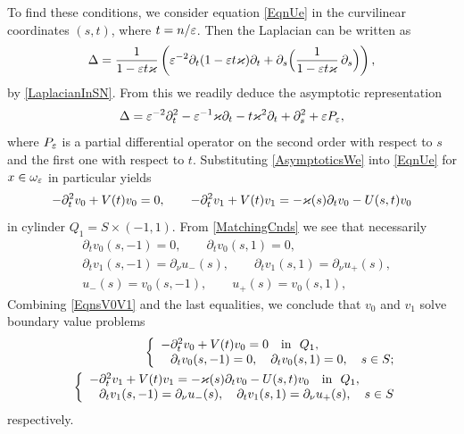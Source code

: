 To find these conditions, we consider equation \eqref{EqnUe} in the curvilinear coordinates $(s,t)$, where $t=n/\varepsilon$.
Then the Laplacian can be written as
\begin{equation}
  \Delta =\frac1{1-\varepsilon t\varkappa}\left( \varepsilon^{-2}\partial_t
(1-\varepsilon t\varkappa)\partial_t +\partial_s
\Big(\frac1{1-\varepsilon t\varkappa}\,\partial_s\Big)\right),
\end{equation}
by \eqref{LaplacianInSN}.
From this we readily deduce the asymptotic representation
$$
\Delta= \varepsilon^{-2}\partial^2_t-\varepsilon^{-1}\varkappa\partial_t-t \varkappa^2\partial_t+\partial^2_s+\varepsilon P_\varepsilon,
$$
where $P_\varepsilon$ is a partial differential operator on the second order with respect to $s$ and the first one with respect to $t$.
Substituting \eqref{AsymptoticsWe} into \eqref{EqnUe} for $x\in \omega_\varepsilon$ in particular yields
\begin{equation}\label{EqnsV0V1}
-\partial_t^2 v_0+V(t)v_0=0, \qquad -\partial_t^2 v_1+V(t)v_1=-\varkappa(s)\partial_t v_0-U(s,t)v_0
\end{equation}
in cylinder $Q_1=S\times(-1,1)$.
From \eqref{MatchingCnds} we see that necessarily
\begin{eqnarray} \nonumber
  &\partial_t v_0(s,- 1)=0, \qquad \partial_t v_0(s, 1)=0, \\\nonumber
&\partial_t v_1(s, -1)=\partial_\nu u_-(s), \qquad
\partial_t v_1(s, 1)=\partial_\nu u_+(s),\\
\label{FittingCnds}
  &u_-(s)=v_0(s,-1),\qquad u_+(s)=v_0(s,1),
\end{eqnarray}
Combining \eqref{EqnsV0V1} and the last equalities, we conclude that $v_0$ and $v_1$ solve boundary value problems
\begin{eqnarray}\label{problemV0}
&&\left\{
  \begin{array}{ll}
    -\partial_t^2 v_0+V(t)v_0=0 \quad \hbox{in \ } Q_1, \\
    \phantom{-}\partial_t v_0(s,- 1)=0, \quad \partial_t v_0(s, 1)=0, \quad s\in S;
  \end{array}
\right.\\\label{problemV1}
&&\left\{
  \begin{array}{ll}
    -\partial_t^2 v_1+V(t)v_1=-\varkappa(s)\partial_t v_0-U(s,t)v_0\quad \hbox{in \ } Q_1, \\
    \phantom{-}\partial_t v_1(s, -1)=\partial_\nu u_-(s), \quad
\partial_t v_1(s, 1)=\partial_\nu u_+(s), \quad s\in S
  \end{array}
\right.
\end{eqnarray}
respectively.

